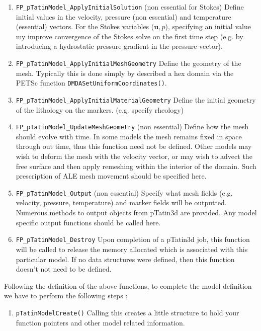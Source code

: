 \documentclass[paper=a4, fontsize=11pt,twoside]{scrartcl}
\newcommand{\ptat}{{pTatin3d}}
\newcommand{\unix}[1]{\texttt{\footnotesize #1}}
\begin{document}
{{\begin{enumerate}
	\item \unix{FP\_pTatinModel\_ApplyInitialSolution} (non essential for Stokes)
	Define initial values in the velocity, pressure (non essential) and temperature (essential) vectors. For the Stokes variables ($\boldsymbol u,p$), specifying an initial value my improve convergence of the Stokes solve on the first time step (e.g. by introducing a hydrostatic pressure gradient in the pressure vector).
	
	\item \unix{FP\_pTatinModel\_ApplyInitialMeshGeometry}
	Define the geometry of the mesh. Typically this is done simply by described a hex domain via the PETSc function \unix{DMDASetUniformCoordinates()}.

	\item \unix{FP\_pTatinModel\_ApplyInitialMaterialGeometry}
	Define the initial geometry of the lithology on the markers. (e.g. specify rheology)

	\item \unix{FP\_pTatinModel\_UpdateMeshGeometry} (non essential)
	Define how the mesh should evolve with time. In some models the mesh remains fixed in space through out time, thus this function need not be defined. Other models may wish to deform the mesh with the velocity vector, or may wish to advect the free surface and then apply remeshing within the interior of the domain. Such prescription of ALE mesh movement should be specified here.

	\item \unix{FP\_pTatinModel\_Output} (non essential)
	Specify what mesh fields (e.g. velocity, pressure, temperature) and marker fields will be outputted. Numerous
	methods to output objects from {\ptat} are provided. Any model specific output functions should be called here.

	\item \unix{FP\_pTatinModel\_Destroy} 
	Upon completion of a {\ptat} job, this function will be called to release the memory allocated which is associated 
	with this particular model. If no data structures were defined, then this function doesn't not need to be defined.
\end{enumerate}


Following the definition of the above functions, to complete the model definition we have to perform the following steps :
\begin{enumerate}
	\item \unix{pTatinModelCreate()}
Calling this creates a little structure to hold your function pointers and other model related information.


\end{enumerate}}}
\end{document}
